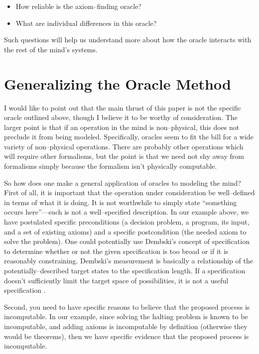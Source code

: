\begin{itemize}
\item How reliable is the axiom--finding oracle?
\item What are individual differences in this oracle?
\end{itemize}

Such questions will help us understand more about how the oracle interacts with the rest of the mind's systems.

\section{Generalizing the Oracle Method}

I would like to point out that the main thrust of this paper is not the specific oracle outlined above, though I believe it to be worthy of consideration.  The larger point is that if an operation in the mind is non--physical, this does not preclude it from being modeled.  Specifically, oracles seem to fit the bill for a wide variety of non--physical operations.  There are probably other operations which will require other formalisms, but the point is that we need not shy away from formalisms simply because the formalism isn't physically computable.  

So how does one make a general application of oracles to modeling the mind?  First of all, it is important that the operation under consideration be well--defined in terms of what it is doing.  It is not worthwhile to simply state ``something occurs here''---such is not a well--specified description.  In our example above, we have postulated specific preconditions (a decision problem, a program, its input, and a set of existing axioms) and a specific postcondition (the needed axiom to solve the problem).  One could potentially use Dembski's concept of specification to determine whether or not the given specification is too broad or if it is reasonably constraining.  Dembski's measurement is basically a relationship of the potentially--described target states to the specification length.  If a specification doesn't sufficiently limit the target space of possibilities, it is not a useful specification \citep{dembski2005}.  

Second, you need to have specific reasons to believe that the proposed process is incomputable.  In our example, since solving the halting problem is known to be incomputable, and adding axioms is incomputable by definition (otherwise they would be theorems), then we have specific evidence that the proposed process is incomputable.  

